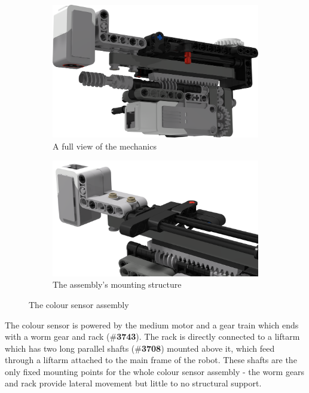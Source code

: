 \documentclass{report}
\newcommand{\tbo}[1]{\textbf{#1}}
\newcommand{\legopiece}[1]{(\#\tbo{#1})}
\begin{document}
	\begin{figure}[H]
		\centering
		\begin{subfigure}[b]{0.35\textwidth}
			\includegraphics[width=\textwidth]{Resources/Images/rdrColorSensorAssembly.png}
			\caption{A full view of the mechanics}
			\label{fig:rdrColorSensorAssembly}
		\end{subfigure}
		\hspace{10mm}
		\begin{subfigure}[b]{0.35\textwidth}
			\includegraphics[width=\textwidth]{Resources/Images/rdrColorSensorShaftDetail.png}
			\caption{The assembly's mounting structure}
			\label{fig:rdrColorSensorShaftDetail}
		\end{subfigure}
		\caption{The colour sensor assembly}
		\label{fig:rdrColorSensor}
	\end{figure}

	The colour sensor is powered by the medium motor and a gear train which ends with a worm gear and rack \legopiece{3743}. The rack is directly connected to a liftarm which has two long parallel shafts \legopiece{3708} mounted above it, which feed through a liftarm attached to the main frame of the robot. These shafts are the only fixed mounting points for the whole colour sensor assembly - the worm gears and rack provide lateral movement but little to no structural support.
	
\end{document}
